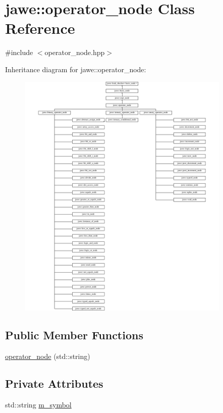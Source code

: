 \hypertarget{classjawe_1_1operator__node}{}\section{jawe\+:\+:operator\+\_\+node Class Reference}
\label{classjawe_1_1operator__node}


{\ttfamily \#include $<$operator\+\_\+node.\+hpp$>$}

Inheritance diagram for jawe\+:\+:operator\+\_\+node\+:\begin{figure}[H]
\begin{center}
\leavevmode
\includegraphics[height=12.000000cm]{classjawe_1_1operator__node}
\end{center}
\end{figure}
\subsection*{Public Member Functions}
\begin{DoxyCompactItemize}
\item 
\hyperlink{classjawe_1_1operator__node_ac5185af17b7c0f8c1f5048bc20a352b9}{operator\+\_\+node} (std\+::string)
\end{DoxyCompactItemize}
\subsection*{Private Attributes}
\begin{DoxyCompactItemize}
\item 
std\+::string \hyperlink{classjawe_1_1operator__node_a30b11040052955f3ed9e487c0c7b76c6}{m\+\_\+symbol}
\end{DoxyCompactItemize}
